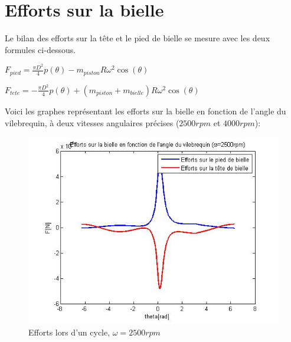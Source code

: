 \documentclass[a4paper,oneside,12pt]{report}
\begin{document}
\section{Efforts sur la bielle}

Le bilan des efforts sur la tête et le pied de bielle se mesure avec les deux formules ci-dessous. 

\begin{center}
$F_{pied} = \frac{\pi D^2}{4}p(\theta) -  m_{piston}R\omega^2 \cos(\theta)  $ \\
\end{center}
\begin{center}
$F_{tete} = -\frac{\pi D^2}{4}p(\theta) +  (m_{piston}+m_{bielle})R\omega^2 \cos(\theta)$ 
\end{center}

Voici les graphes représentant les efforts sur la bielle en fonction de l'angle du vilebrequin, à deux vitesses angulaires précises ($2500rpm$ et $4000rpm$):

\begin{figure}[H]
\center
\includegraphics[scale=0.7]{effort_2500rpm.jpg}
\caption{Efforts lors d'un cycle, $\omega=2500rpm$}
\end{figure}
\end{document}
